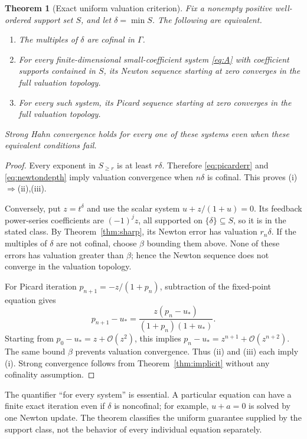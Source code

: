 \documentclass[11pt,a4paper]{article}
\newtheorem{theorem}{Theorem}[section]
\theoremstyle{definition}
\theoremstyle{remark}
\newcommand{\Ocal}{\mathcal O}
\begin{document}
\begin{theorem}[Exact uniform valuation criterion]
\label{thm:valuationcriterion}
Fix a nonempty positive well-ordered support set $S$, and let
$\delta=\min S$. The following are equivalent.
\begin{enumerate}[label=\textup{(\roman*)}]
\item The multiples of $\delta$ are cofinal in $\Gamma$.
\item For every finite-dimensional small-coefficient system
\eqref{eq:A} with coefficient supports contained in $S$, its Newton
sequence starting at zero converges in the full valuation topology.
\item For every such system, its Picard sequence starting at zero
converges in the full valuation topology.
\end{enumerate}
Strong Hahn convergence holds for every one of these systems even when
these equivalent conditions fail.
\end{theorem}
\begin{proof}
Every exponent in $S_{\ge r}$ is at least $r\delta$. Therefore
\eqref{eq:picarderr} and \eqref{eq:newtondepth} imply valuation convergence
when $n\delta$ is cofinal. This proves (i)$\Rightarrow$(ii),(iii).

Conversely, put $z=t^\delta$ and use the scalar system
$u+z/(1+u)=0$. Its feedback power-series coefficients are $(-1)^jz$,
all supported on $\{\delta\}\subseteq S$, so it is in the stated class.
By Theorem~\ref{thm:sharp}, its Newton error has valuation $r_n\delta$.
If the multiples of $\delta$ are not cofinal, choose $\beta$ bounding them
above. None of these errors has valuation greater than $\beta$; hence the
Newton sequence does not converge in the valuation topology.

For Picard iteration $p_{n+1}=-z/(1+p_n)$, subtraction of the fixed-point
equation gives
\[
 p_{n+1}-u_*
 =\frac{z(p_n-u_*)}{(1+p_n)(1+u_*)}.
\]
Starting from $p_0-u_*=z+\Ocal(z^2)$, this implies
$p_n-u_*=z^{n+1}+\Ocal(z^{n+2})$. The same bound $\beta$ prevents valuation
convergence. Thus (ii) and (iii) each imply (i). Strong convergence follows
from Theorem~\ref{thm:implicit} without any cofinality assumption.
\end{proof}

The quantifier ``for every system'' is essential. A particular equation
can have a finite exact iteration even if $\delta$ is noncofinal; for
example, $u+a=0$ is solved by one Newton update. The theorem classifies the
uniform guarantee supplied by the support class, not the behavior of every
individual equation separately.
\end{document}
